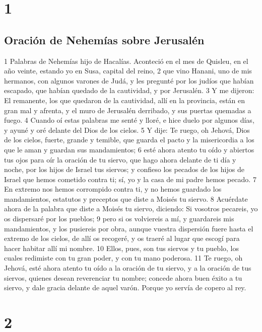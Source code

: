 
\chapter{1}

\section*{Oración de Nehemías sobre Jerusalén}

1 Palabras de Nehemías hijo de Hacalías. Aconteció en el mes de Quisleu, en el año veinte, estando yo en Susa, capital del reino,
2 que vino Hanani, uno de mis hermanos, con algunos varones de Judá, y les pregunté por los judíos que habían escapado, que habían quedado de la cautividad, y por Jerusalén.
3 Y me dijeron: El remanente, los que quedaron de la cautividad, allí en la provincia, están en gran mal y afrenta, y el muro de Jerusalén derribado, y sus puertas quemadas a fuego.
4 Cuando oí estas palabras me senté y lloré, e hice duelo por algunos días, y ayuné y oré delante del Dios de los cielos.
5 Y dije: Te ruego, oh Jehová, Dios de los cielos, fuerte, grande y temible, que guarda el pacto y la misericordia a los que le aman y guardan sus mandamientos;
6 esté ahora atento tu oído y abiertos tus ojos para oír la oración de tu siervo, que hago ahora delante de ti día y noche, por los hijos de Israel tus siervos; y confieso los pecados de los hijos de Israel que hemos cometido contra ti; sí, yo y la casa de mi padre hemos pecado.
7 En extremo nos hemos corrompido contra ti, y no hemos guardado los mandamientos, estatutos y preceptos que diste a Moisés tu siervo.
8 Acuérdate ahora de la palabra que diste a Moisés tu siervo, diciendo: Si vosotros pecareis, yo os dispersaré por los pueblos;
9 pero si os volviereis a mí, y guardareis mis mandamientos, y los pusiereis por obra, aunque vuestra dispersión fuere hasta el extremo de los cielos, de allí os recogeré, y os traeré al lugar que escogí para hacer habitar allí mi nombre. 
10 Ellos, pues, son tus siervos y tu pueblo, los cuales redimiste con tu gran poder, y con tu mano poderosa.
11 Te ruego, oh Jehová, esté ahora atento tu oído a la oración de tu siervo, y a la oración de tus siervos, quienes desean reverenciar tu nombre; concede ahora buen éxito a tu siervo, y dale gracia delante de aquel varón. Porque yo servía de copero al rey.

\chapter{2}

